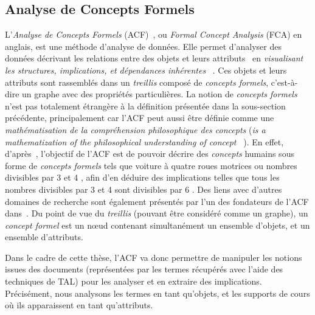 \bigskip


\subsection{Analyse de Concepts Formels}
\label{subsection:Contexte:TechniquesUtilisees:ACF}

L'\textit{Analyse de Concepts Formels} (ACF)~\cite{wille1982restructuring}\cite{wille2005formal}, ou \textit{Formal Concept Analysis} (FCA) en anglais, est une méthode d'analyse de données.
Elle permet d'analyser des données décrivant les relations entre des objets et leurs attributs~\cite{belohlavek2008introduction} en \og \textit{visualisant les structures, implications, et dépendances inhérentes} \fg~\cite{wormuth2004introduction}.
Ces objets et leurs attributs sont rassemblés dans un \textit{treillis} composé de \textit{concepts formels}, c'est-à-dire un graphe avec des propriétés particulières.
La notion de \textit{concepts formels} n'est pas totalement étrangère à la définition présentée dans la sous-section précédente, principalement car l'ACF peut aussi être définie comme une \og \textit{mathématisation de la compréhension philosophique des concepts} \fg (\og \textit{is a mathematization of the philosophical understanding of concept} \fg~\cite{wormuth2004introduction}).
En effet, d'après~\cite{belohlavek2008introduction}, l'objectif de l'ACF est de pouvoir décrire des \textit{concepts} humains sous forme de \textit{concepts formels} tels que \og voiture à quatre roues motrices \fg ou \og nombres divisibles par 3 et 4 \fg, afin d'en déduire des implications telles que \og tous les nombres divisibles par 3 et 4 sont divisibles par 6 \fg.
Des liens avec d'autres domaines de recherche sont également présentés par l'un des fondateurs de l'ACF dans~\cite{wille2005formal}.
Du point de vue du \textit{treillis} (pouvant être considéré comme un graphe), un \textit{concept formel} est un n\oe{}ud contenant simultanément un ensemble d'objets, et un ensemble d'attributs.

Dans le cadre de cette thèse, l'ACF va donc permettre de manipuler les notions issues des documents (représentées par les termes récupérés avec l'aide des techniques de TAL) pour les analyser et en extraire des implications.
Précisément, nous analysons les termes en tant qu'objets, et les supports de cours où ils apparaissent en tant qu'attributs.

